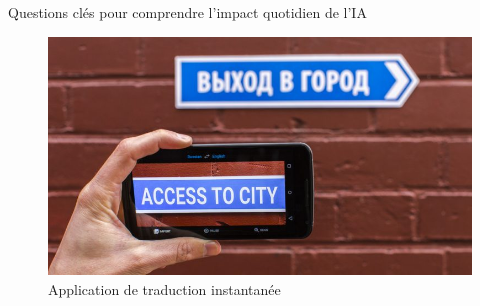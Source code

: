\documentclass{beamer}
\begin{document}
\begin{frame}{Questions clés pour comprendre l'impact quotidien de l'IA}
\begin{figure}[h]
\begin{minipage}{0.4\textwidth}
				\caption{Resultat de recherche personalisée}
			\end{minipage}\hfill
			\begin{minipage}{0.32\textwidth}
				\centering
				\includegraphics[width=\linewidth]{googlet.jpg}
				\caption{Application de traduction instantanée}
			\end{minipage}
		\end{figure}
		
	\end{frame}	
		
\end{document}

